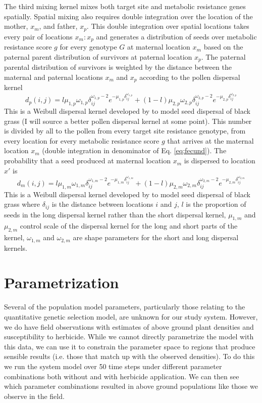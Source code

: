 \documentclass[12pt, a4paper]{article}
\begin{document}
The third mixing kernel mixes both target site and metabolic resistance genes spatially. Spatial mixing also requires double integration over the location of the mother, $x_m$, and father, $x_p$. This double integration over spatial locations takes every pair of locations $x_m:x_p$ and generates a distribution of seeds over metabolic resistance score $g$ for every genotype $G$ at maternal location $x_m$ based on the paternal parent distribution of survivors at paternal location $x_p$. The paternal parental distribution of survivors is weighted by the distance between the maternal and paternal locations $x_m$ and $x_p$ according to the pollen dispersal kernel 
\begin{equation}\label{eq:pollen_disp}
	d_p(i, j) = l\mu_{1,p}\omega_{1,p}\delta_{ij}^{\omega_{1,p} - 2}e^{-\mu_{1,p}\delta_{ij}^{\omega_{1,p}}} + (1 - l) \mu_{2,p}\omega_{2,p}\delta_{ij}^{\omega_{2,p} - 2}e^{-\mu_{2,p}\delta_{ij}^{\omega_{2,p}}}
\end{equation} 
This is a Weibull dispersal kernel developed by \cite{Colb2001} to model seed dispersal of black grass (I will source a better pollen dispersal kernel at some point). This number is divided by all to the pollen from every target site resistance genotype, from every location for every metabolic resistance score $g$ that arrives at the maternal location $x_m$ (double integration in denominator of Eq. \ref{eq:fecund}). The probability that a seed produced at maternal location $x_m$ is dispersed to location $x'$ is 
\begin{equation}\label{eq:seed_disp}
	d_m(i, j) = l\mu_{1,m}\omega_{1,m}\delta_{ij}^{\omega_{1,m} - 2}e^{-\mu_{1,m}\delta_{ij}^{\omega_{1,m}}} + (1 - l) \mu_{2,m}\omega_{2,m}\delta_{ij}^{\omega_{2,m} - 2}e^{-\mu_{2,m}\delta_{ij}^{\omega_{2,m}}}
\end{equation} 
This is a Weibull dispersal kernel developed by \cite{Colb2001} to model seed dispersal of black grass where $\delta_{ij}$ is the distance between locations $i$ and $j$, $l$ is the proportion of seeds in the long dispersal kernel rather than the short dispersal kernel, $\mu_{1, m}$ and $\mu_{2, m}$ control scale of the dispersal kernel for the long and short parts of the kernel, $\omega_{1, m}$ and $\omega_{2, m}$ are shape parameters for the short and long dispersal kernels.    

\section{Parametrization}
Several of the population model parameters, particularly those relating to the quantitative genetic selection model, are unknown for our study system. However, we do have field observations with estimates of above ground plant densities and susceptibility to herbicide. While we cannot directly parametrize the model with this data, we can use it to constrain the parameter space to regions that produce sensible results (i.e. those that match up with the observed densities). To do this we run the system model over 50 time steps under different parameter combinations both without and with herbicide application. We can then see which parameter combinations resulted in above ground populations like those we observe in the field.  
\end{document}
